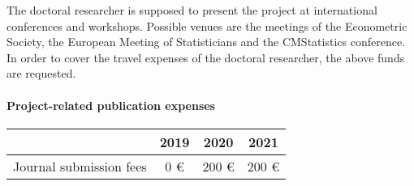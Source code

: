 \documentclass[a4paper,12pt]{article}
\begin{document}
\noindent The doctoral researcher is supposed to present the project at international conferences and workshops. Possible venues are the meetings of the Econometric Society, the European Meeting of Statisticians and the CMStatistics conference. %
In order to cover the travel expenses of the doctoral researcher, the above funds are requested. 




\paragraph{Project-related publication expenses}

\begin{center}

\begin{tabular}{l c c c}
 & 2019 & 2020 & 2021 \\
\hline 
Journal submission fees & 0 \euro{} & 200 \euro{} & 200 \euro{} \\
\end{tabular}
\end{center}




\end{document}
